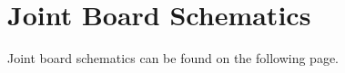 \section{Joint Board Schematics}
\label{app:joint_board_schem}
Joint board schematics can be found on the following page.

